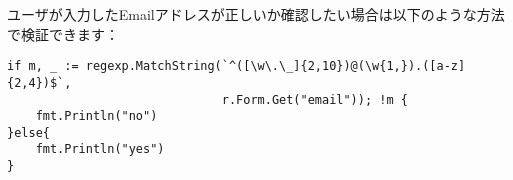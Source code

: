 ユーザが入力したEmailアドレスが正しいか確認したい場合は以下のような方法で検証できます：

\begin{lstlisting}[numbers=none]
if m, _ := regexp.MatchString(`^([\w\.\_]{2,10})@(\w{1,}).([a-z]{2,4})$`,
                              r.Form.Get("email")); !m {
    fmt.Println("no")
}else{
    fmt.Println("yes")
}
\end{lstlisting}
